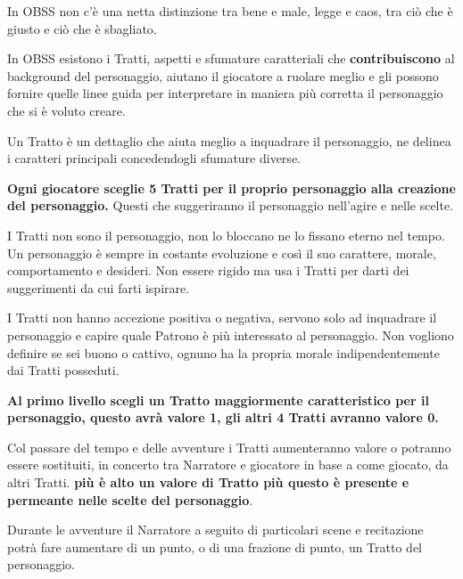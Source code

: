 \begin{multicols}{2}

In OBSS non c'è una netta distinzione tra bene e male, legge e caos, tra ciò che è giusto e ciò che è sbagliato.

In OBSS esistono i Tratti, aspetti e sfumature caratteriali che \textbf{contribuiscono} al background del personaggio, aiutano il giocatore a ruolare meglio e gli possono fornire quelle linee guida per interpretare in maniera più corretta il personaggio che si è voluto creare.

Un Tratto è un dettaglio che aiuta meglio a inquadrare il personaggio, ne delinea i caratteri principali concedendogli sfumature diverse.

\textbf{Ogni giocatore sceglie 5 Tratti per il proprio personaggio alla creazione del personaggio.} Questi che suggeriranno il personaggio nell'agire e nelle scelte.

\medskip

\begin{changemargin}{0.3cm}{0.3cm}\begin{tcolorbox}[title = Scegliere i Tratti] %
I Tratti non sono il personaggio, non lo bloccano ne lo fissano eterno nel tempo. Un personaggio è sempre in costante evoluzione e così il suo carattere, morale, comportamento e desideri. Non essere rigido ma usa i Tratti per darti dei suggerimenti da cui farti ispirare.
\end{tcolorbox}\end{changemargin}

\medskip

I Tratti non hanno accezione positiva o negativa, servono solo ad inquadrare il personaggio e capire quale Patrono è più interessato al personaggio. Non vogliono definire se sei buono o cattivo, ognuno ha la propria morale indipendentemente dai Tratti posseduti.

\textbf{Al primo livello scegli un Tratto maggiormente caratteristico per il personaggio, questo avrà valore 1, gli altri 4 Tratti avranno valore 0.}

Col passare del tempo e delle avventure i Tratti aumenteranno valore o potranno essere sostituiti, in concerto tra Narratore e giocatore in base a come giocato, da altri Tratti. \textbf{più è alto un valore di Tratto più questo è presente e permeante nelle scelte del personaggio}.

Durante le avventure il Narratore a seguito di particolari scene e recitazione potrà fare aumentare di un punto, o di una frazione di punto, un Tratto del personaggio.


\end{multicols}
